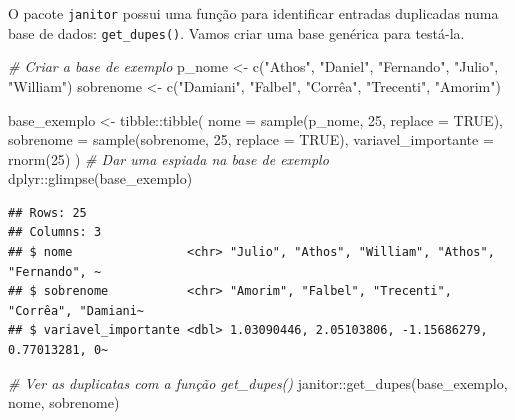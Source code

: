 \documentclass[
]{book}
\newenvironment{Shaded}{\begin{snugshade}}{\end{snugshade}}
\newcommand{\AttributeTok}[1]{\textcolor[rgb]{0.77,0.63,0.00}{#1}}
\newcommand{\CommentTok}[1]{\textcolor[rgb]{0.56,0.35,0.01}{\textit{#1}}}
\newcommand{\ConstantTok}[1]{\textcolor[rgb]{0.00,0.00,0.00}{#1}}
\newcommand{\DecValTok}[1]{\textcolor[rgb]{0.00,0.00,0.81}{#1}}
\newcommand{\FunctionTok}[1]{\textcolor[rgb]{0.00,0.00,0.00}{#1}}
\newcommand{\NormalTok}[1]{#1}
\newcommand{\OtherTok}[1]{\textcolor[rgb]{0.56,0.35,0.01}{#1}}
\newcommand{\SpecialCharTok}[1]{\textcolor[rgb]{0.00,0.00,0.00}{#1}}
\newcommand{\StringTok}[1]{\textcolor[rgb]{0.31,0.60,0.02}{#1}}
\begin{document}
O pacote \texttt{janitor} possui uma função para identificar entradas duplicadas numa base de dados: \texttt{get\_dupes()}. Vamos criar uma base genérica para testá-la.

\begin{Shaded}
\begin{Highlighting}[]
\CommentTok{\# Criar a base de exemplo}
\NormalTok{p\_nome }\OtherTok{\textless{}{-}} \FunctionTok{c}\NormalTok{(}\StringTok{"Athos"}\NormalTok{, }\StringTok{"Daniel"}\NormalTok{, }\StringTok{"Fernando"}\NormalTok{, }\StringTok{"Julio"}\NormalTok{, }\StringTok{"William"}\NormalTok{)}
\NormalTok{sobrenome }\OtherTok{\textless{}{-}} \FunctionTok{c}\NormalTok{(}\StringTok{"Damiani"}\NormalTok{, }\StringTok{"Falbel"}\NormalTok{, }\StringTok{"Corrêa"}\NormalTok{, }\StringTok{"Trecenti"}\NormalTok{, }\StringTok{"Amorim"}\NormalTok{)}

\NormalTok{base\_exemplo }\OtherTok{\textless{}{-}}\NormalTok{ tibble}\SpecialCharTok{::}\FunctionTok{tibble}\NormalTok{(}
  \AttributeTok{nome =} \FunctionTok{sample}\NormalTok{(p\_nome, }\DecValTok{25}\NormalTok{, }\AttributeTok{replace =} \ConstantTok{TRUE}\NormalTok{),}
  \AttributeTok{sobrenome =} \FunctionTok{sample}\NormalTok{(sobrenome, }\DecValTok{25}\NormalTok{, }\AttributeTok{replace =} \ConstantTok{TRUE}\NormalTok{),}
  \AttributeTok{variavel\_importante =} \FunctionTok{rnorm}\NormalTok{(}\DecValTok{25}\NormalTok{)}
\NormalTok{)}
\CommentTok{\# Dar uma espiada na base de exemplo}
\NormalTok{dplyr}\SpecialCharTok{::}\FunctionTok{glimpse}\NormalTok{(base\_exemplo)}
\end{Highlighting}
\end{Shaded}

\begin{verbatim}
## Rows: 25
## Columns: 3
## $ nome                <chr> "Julio", "Athos", "William", "Athos", "Fernando", ~
## $ sobrenome           <chr> "Amorim", "Falbel", "Trecenti", "Corrêa", "Damiani~
## $ variavel_importante <dbl> 1.03090446, 2.05103806, -1.15686279, 0.77013281, 0~
\end{verbatim}

\begin{Shaded}
\begin{Highlighting}[]
\CommentTok{\# Ver as duplicatas com a função get\_dupes()}
\NormalTok{janitor}\SpecialCharTok{::}\FunctionTok{get\_dupes}\NormalTok{(base\_exemplo, nome, sobrenome)}
\end{Highlighting}
\end{Shaded}
\end{document}
